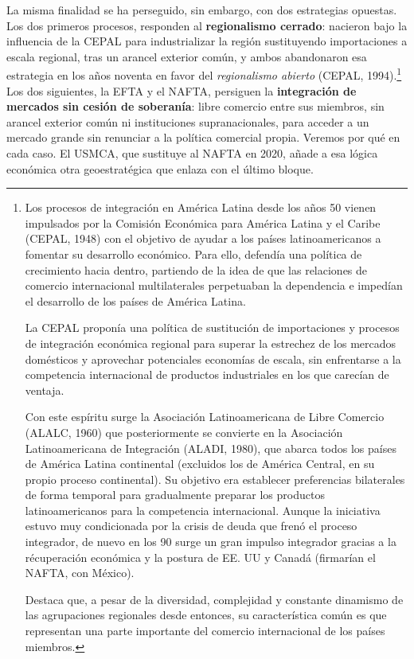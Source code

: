 \documentclass[10pt,a4paper]{article}
\begin{document}
La misma finalidad se ha perseguido, sin embargo, con dos estrategias opuestas. Los dos primeros procesos, responden al \textbf{regionalismo cerrado}: nacieron bajo la influencia de la CEPAL para industrializar la región sustituyendo importaciones a escala regional, tras un arancel exterior común, y ambos abandonaron esa estrategia en los años noventa en favor del \textit{regionalismo abierto} (CEPAL, 1994).\footnote{%
    Los procesos de integración en América Latina desde los años 50 vienen impulsados por la Comisión Económica para América Latina y el Caribe (CEPAL, 1948) con el objetivo de ayudar a los países latinoamericanos a fomentar su desarrollo económico. Para ello, defendía una política de crecimiento hacia dentro, partiendo de la idea de que las relaciones de comercio internacional multilaterales perpetuaban la dependencia e impedían el desarrollo de los países de América Latina. 
    
    La CEPAL proponía una política de sustitución de importaciones y procesos de integración económica regional para superar la estrechez de los mercados domésticos y aprovechar potenciales economías de escala, sin enfrentarse a la competencia internacional de productos industriales en los que carecían de ventaja.

    Con este espíritu surge la Asociación Latinoamericana de Libre Comercio (ALALC, 1960) que posteriormente se convierte en la Asociación Latinoamericana de Integración (ALADI, 1980), que abarca todos los países de América Latina continental (excluidos los de América Central, en su propio proceso continental). Su objetivo era establecer preferencias bilaterales de forma temporal para gradualmente preparar los productos latinoamericanos para la competencia internacional. Aunque la iniciativa estuvo muy condicionada por la crisis de deuda que frenó el proceso integrador, de nuevo en los 90 surge un gran impulso integrador gracias a la récuperación económica y la postura de EE. UU y Canadá (firmarían el NAFTA, con México). 
        
    Destaca que, a pesar de la diversidad, complejidad y constante dinamismo de las agrupaciones regionales desde entonces, su característica común es que representan una parte importante del comercio internacional de los países miembros.
} Los dos siguientes, la EFTA y el NAFTA, persiguen la \textbf{integración de mercados sin cesión de soberanía}: libre comercio entre sus miembros, sin arancel exterior común ni instituciones supranacionales, para acceder a un mercado grande sin renunciar a la política comercial propia. Veremos por qué en cada caso. El USMCA, que sustituye al NAFTA en 2020, añade a esa lógica económica otra geoestratégica que enlaza con el último bloque.
\end{document}
